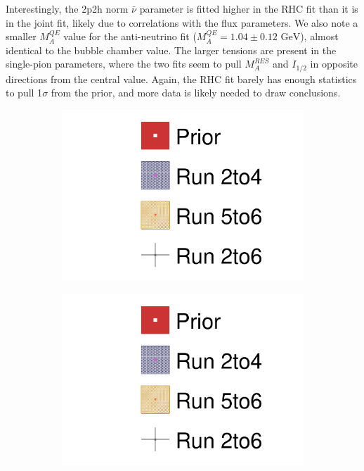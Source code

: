 Interestingly, the 2p2h norm $\bar{\nu}$ parameter is fitted higher in the RHC fit than it is in the joint fit, likely due to correlations with the flux parameters. We also note a smaller $M_A^{QE}$ value for the anti-neutrino fit ($M_A^{QE} = 1.04\pm0.12 \text{ GeV}$), almost identical to the bubble chamber value. The larger tensions are present in the single-pion parameters, where the two fits seem to pull $M_A^{RES}$ and $I_{1/2}$ in opposite directions from the central value. Again, the RHC fit barely has enough statistics to pull 1$\sigma$ from the prior, and more data is likely needed to draw conclusions.
\begin{figure}[h]
	\begin{subfigure}[t]{0.49\textwidth}
		\includegraphics[width=\textwidth, trim={0mm 0mm 0mm 0mm}, clip,page=18]{figures/mach3/data/alt/2017b_Run2to4_Data_merge_2017b_Run56_Data_merge_2017b_NewData_NewDet_UpdXsecStep_2Xsec_4Det_5Flux_0}
	\end{subfigure}
	\begin{subfigure}[t]{0.49\textwidth}
		\includegraphics[width=\textwidth, trim={0mm 0mm 0mm 0mm}, clip,page=19]{figures/mach3/data/alt/2017b_Run2to4_Data_merge_2017b_Run56_Data_merge_2017b_NewData_NewDet_UpdXsecStep_2Xsec_4Det_5Flux_0}
	\end{subfigure}
	

\end{figure}
